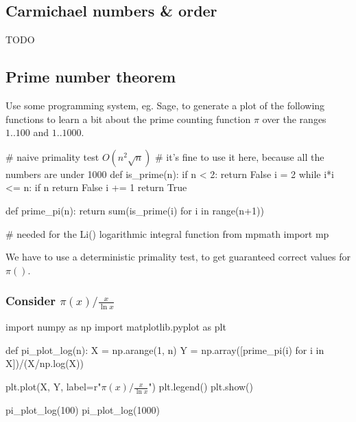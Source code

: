 \documentclass{article}
\begin{document}
  \subsection{Carmichael numbers \& order}
  TODO

  \subsection{Prime number theorem}
  \begin{centerframebox}
    Use some programming system, eg. Sage, to generate a plot of the following functions to learn a bit about the prime counting function $\pi$ over the ranges $1..100$ and $1..1000$.
  \end{centerframebox}
  \begin{mylisting}
    # naive primality test $O(n^2\sqrt{n})$
    # it's fine to use it here, because all the numbers are under 1000
    def is_prime(n):
      if n < 2:
        return False
      i = 2
      while i*i <= n:
        if n %
          return False
        i += 1
      return True

    def prime_pi(n):
      return sum(is_prime(i) for i in range(n+1))

    # needed for the Li() logarithmic integral function
    from mpmath import mp
  \end{mylisting}
  We have to use a deterministic primality test, to get guaranteed correct values for $\pi()$.

  \subsubsection{Consider $\pi(x)/\frac{x}{\ln x}$}
  \begin{mylisting}
    import numpy as np
    import matplotlib.pyplot as plt

    def pi_plot_log(n):
      X = np.arange(1, n)
      Y = np.array([prime_pi(i) for i in X])/(X/np.log(X))

      plt.plot(X, Y, label=r"$\pi(x)/\frac{x}{\ln x}$")
      plt.legend()
      plt.show()

    pi_plot_log(100)
    pi_plot_log(1000)
  \end{mylisting}
\end{document}
